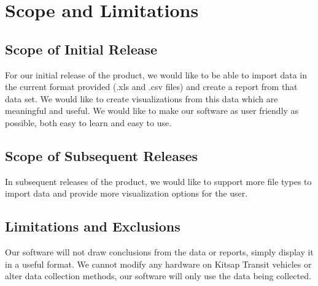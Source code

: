 \section{Scope and Limitations}
%
\subsection{Scope of Initial Release}
For our initial release of the product, we would like to be able to import data in the current
format provided (.xls and .csv files) and create a report from that data set. We would like
to create visualizations from this data which are meaningful and useful. We would like to
make our software as user friendly as possible, both easy to learn and easy to use. 

\subsection{Scope of Subsequent Releases}
In subsequent releases of the product, we would like to support more file types to import
data and provide more visualization options for the user. 

\subsection{Limitations and Exclusions}
Our software will not draw conclusions from the data or reports, simply display it in a useful
format. We cannot modify any hardware on Kitsap Transit vehicles or alter data collection
methods, our software will only use the data being collected. 